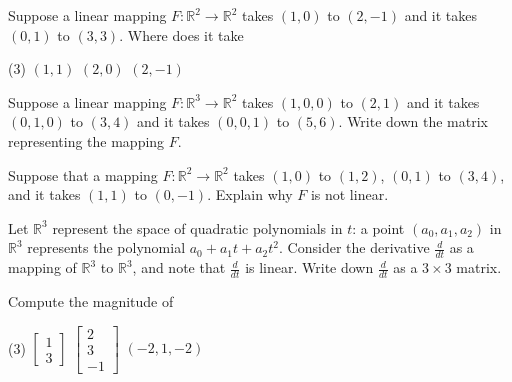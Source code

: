 \begin{exercise}
Suppose a linear mapping $F \colon {\mathbb R}^2 \to {\mathbb R}^2$
takes $(1,0)$ to $(2,-1)$ and it takes $(0,1)$ to $(3,3)$. 
Where does it take
\begin{tasks}(3)
\task
$(1,1)$
\task
$(2,0)$
\task
$(2,-1)$
\end{tasks}
\end{exercise}

\begin{exercise}
Suppose a linear mapping $F \colon {\mathbb R}^3 \to {\mathbb R}^2$
takes $(1,0,0)$ to $(2,1)$ and it takes $(0,1,0)$ to $(3,4)$ and
it takes $(0,0,1)$ to $(5,6)$.  Write down the matrix representing
the mapping $F$.
\end{exercise}

\begin{exercise}
Suppose that a mapping $F \colon {\mathbb R}^2 \to \mathbb{R}^2$ takes
$(1,0)$ to $(1,2)$, $(0,1)$ to $(3,4)$, and it takes $(1,1)$ to $(0,-1)$.
Explain why $F$ is not linear.
\end{exercise}

\begin{exercise}[Challenging]
Let ${\mathbb R}^3$ represent the space of quadratic polynomials
in $t$: a point $(a_0,a_1,a_2)$ in ${\mathbb R}^3$ represents
the polynomial $a_0 + a_1 t + a_2 t^2$.
Consider the derivative $\frac{d}{dt}$ as a mapping of ${\mathbb R}^3$ to
${\mathbb R}^3$,
and note that $\frac{d}{dt}$ is linear.
Write down $\frac{d}{dt}$ as a $3 \times 3$ matrix.
\end{exercise}

\setcounter{exercise}{100}

\begin{exercise}
Compute the magnitude of
\begin{tasks}(3)
\task
$\begin{bmatrix}
1 \\
3
\end{bmatrix}
$
\task
$\begin{bmatrix}
2 \\
3 \\
-1
\end{bmatrix}
$
\task
$(-2,1,-2)$
\end{tasks}
\end{exercise}

